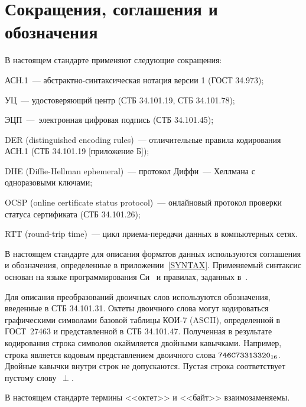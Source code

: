 \chapter{Сокращения, соглашения и обозначения}\label{DEFS}

В настоящем стандарте применяют следующие сокращения:

АСН.1~--- абстрактно-синтаксическая нотация версии 1 (ГОСТ 34.973);

УЦ~--- удостоверяющий центр (СТБ 34.101.19, СТБ 34.101.78);

ЭЦП~---~электронная цифровая подпись (СТБ 34.101.45);

DER (distinguished encoding rules)~--- отличительные правила кодирования АСН.1
(СТБ 34.101.19 [приложение Б]);

DHE (Diffie-Hellman ephemeral)~--- протокол Диффи~--- Хеллмана с одноразовыми 
ключами;

OCSP (online certificate status protocol)~--- онлайновый протокол проверки 
статуса сертификата (СТБ 34.101.26);

RTT (round-trip time)~--- цикл приема-передачи данных в компьютерных сетях.

В настоящем стандарте для описания форматов данных используются соглашения 
и обозначения, определенные в приложении~\ref{SYNTAX}. Применяемый 
синтаксис основан на языке программирования Си~\cite{ISO9899} и правилах, 
заданных в~\cite{RFC4506}.

Для описания преобразований двоичных слов используются обозначения, введенные в 
СТБ 34.101.31. 
%
Октеты двоичного слова могут кодироваться графическими символами базовой таблицы 
КОИ-7 (ASCII), определенной в ГОСТ~27463 и представленной в СТБ 34.101.47. 
Полученная в результате кодирования строка символов окаймляется двойными кавычками. 
%
Например, строка  является кодовым представлением двоичного 
слова $\texttt{746C73313320}_{16}$.
%
Двойные кавычки внутри строк не допускаются.
%
Пустая строка \str{} соответствует пустому слову~$\perp$.

В настоящем стандарте термины <<октет>> и <<байт>> взаимозаменяемы.

